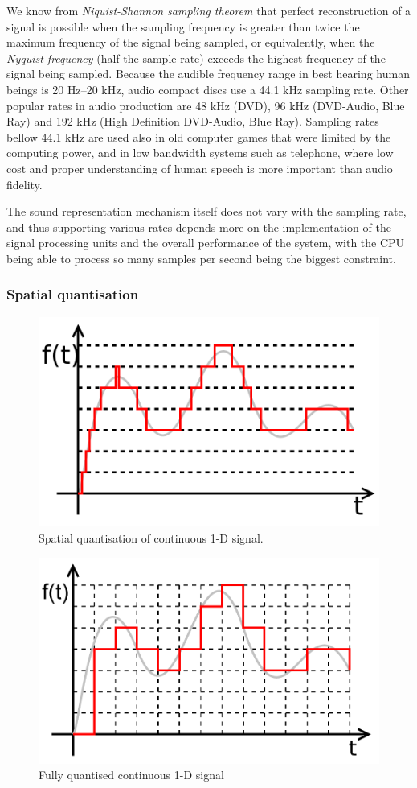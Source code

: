 We know from \emph{Niquist-Shannon sampling
  theorem} that perfect
reconstruction of a signal is possible when the sampling frequency is
greater than twice the maximum frequency of the signal being sampled,
or equivalently, when the  \emph{Nyquist
  frequency} (half the sample rate) exceeds the highest frequency of
the signal being sampled. Because the audible frequency range in best
hearing human beings is 20 Hz--20 kHz, audio compact discs use a 44.1
kHz sampling rate. Other popular rates in audio production are 48 kHz
(DVD), 96 kHz (DVD-Audio, Blue Ray) and 192 kHz (High Definition
DVD-Audio, Blue Ray). Sampling rates bellow 44.1 kHz are used also in
old computer games that were limited by the computing power, and in
low bandwidth systems such as telephone, where low cost and proper
understanding of human speech is more important than audio fidelity.

The sound representation mechanism itself does not vary with the
sampling rate, and thus supporting various rates depends more on the
implementation of the signal processing units and the overall
performance of the system, with the CPU being able to process so many
samples per second being the biggest constraint.

\subsubsection{Spatial quantisation}

\begin{figure}[h!]
  \centering
  \includegraphics[width=.7\textwidth]{pic/sampled-2.pdf}
  \caption{Spatial quantisation of continuous 1-D signal.}
  \label{fig:sampled-2}  
\end{figure}

\begin{figure}[h!]
  \centering
  \includegraphics[width=.7\textwidth]{pic/sampled-3.pdf}
  \caption{Fully quantised continuous 1-D signal}
  \label{fig:sampled-3}
\end{figure}

